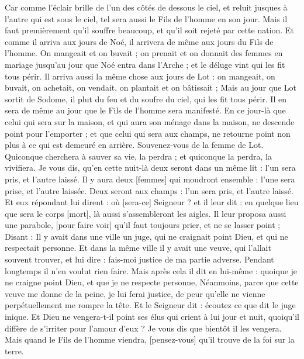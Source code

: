 \begin{multicols}{2}
Car comme l'éclair brille de l'un des côtés de dessous le ciel, et reluit jusques à l'autre qui est sous le ciel, tel sera aussi le Fils de l'homme en son jour.
Mais il faut premièrement qu'il souffre beaucoup, et qu'il soit rejeté par cette nation.
Et comme il arriva aux jours de Noé, il arrivera de même aux jours du Fils de l'homme.
On mangeait et on buvait ; on prenait et on donnait des femmes en mariage jusqu'au jour que Noé entra dans l'Arche ; et le déluge vint qui les fit tous périr.
Il arriva aussi la même chose aux jours de Lot : on mangeait, on buvait, on achetait, on vendait, on plantait et on bâtissait ;
Mais au jour que Lot sortit de Sodome, il plut du feu et du soufre du ciel, qui les fit tous périr.
Il en sera de même au jour que le Fils de l'homme sera manifesté.
En ce jour-là que celui qui sera sur la maison, et qui aura son ménage dans la maison, ne descende point pour l'emporter ; et que celui qui sera aux champs, ne retourne point non plus à ce qui est demeuré en arrière.
Souvenez-vous de la femme de Lot.
Quiconque cherchera à sauver sa vie, la perdra ; et quiconque la perdra, la vivifiera.
Je vous dis, qu'en cette nuit-là deux seront dans un même lit : l'un sera pris, et l'autre laissé.
Il y aura deux [femmes] qui moudront ensemble : l'une sera prise, et l'autre laissée.
Deux seront aux champs : l'un sera pris, et l'autre laissé.
Et eux répondant lui dirent : où [sera-ce] Seigneur ? et il leur dit : en quelque lieu que sera le corps [mort], là aussi s'assembleront les aigles.
\VerseOne{}Il leur proposa aussi une parabole, [pour faire voir] qu'il faut toujours prier, et ne se lasser point ;
Disant : Il y avait dans une ville un juge, qui ne craignait point Dieu, et qui ne respectait personne.
Et dans la même ville il y avait une veuve, qui l'allait souvent trouver, et lui dire : fais-moi justice de ma partie adverse.
Pendant longtemps il n'en voulut rien faire. Mais après cela il dit en lui-même : quoique je ne craigne point Dieu, et que je ne respecte personne,
Néanmoins, parce que cette veuve me donne de la peine, je lui ferai justice, de peur qu'elle ne vienne perpétuellement me rompre la tête.
Et le Seigneur dit : écoutez ce que dit le juge inique.
Et Dieu ne vengera-t-il point ses élus qui crient à lui jour et nuit, quoiqu'il diffère de s'irriter pour l'amour d'eux ?
Je vous dis que bientôt il les vengera. Mais quand le Fils de l'homme viendra, [pensez-vous] qu'il trouve de la foi sur la terre.

\end{multicols}
